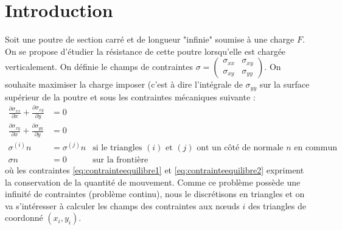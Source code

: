 \section*{Introduction}
Soit une poutre de section carré et de longueur "infinie" soumise à une charge $F$. On se propose d'étudier la résistance de cette poutre lorsqu'elle est chargée verticalement. On définie le champs de contraintes $\sigma = \begin{pmatrix}
\sigma_{xx} & \sigma_{xy}\\
\sigma_{xy} & \sigma_{yy}
\end{pmatrix}$. On souhaite maximiser la charge imposer (c'est à dire l'intégrale de $\sigma_{yy}$ sur la surface supérieur de la poutre et sous les contraintes mécaniques suivante : 
\begin{align}
\frac{\partial \sigma_{xx}}{\partial x} + \frac{\partial \sigma_{xy}}{\partial y} &= 0 \label{eq:contrainteequilibre1}\\
\frac{\partial \sigma_{xy}}{\partial x} + \frac{\partial \sigma_{yy}}{\partial y} &= 0\label{eq:contrainteequilibre2}\\
\sigma^{(i)}n &= \sigma^{(j)}n & \text{si le triangles $(i)$ et $(j)$ ont un côté de normale $n$ en commun} \label{eq:contrainteContinuite}\\
\sigma n &= 0 & \text{sur la frontière} \label{eq:contrainteFrontiere}
\end{align}
où les contraintes \eqref{eq:contrainteequilibre1} et \eqref{eq:contrainteequilibre2} expriment la conservation de la quantité de mouvement. Comme ce problème possède une infinité de contraintes (problème continu), nous le discrétisons en triangles et on va s'intéresser à calculer les champs des contraintes aux nœuds $i$ des triangles de coordonné $(x_i,y_i)$.

\newpage

